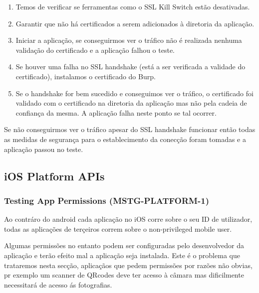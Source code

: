 \begin{enumerate}
\item Temos de verificar se ferramentas como o SSL Kill Switch estão desativadas.\par
\hfill\par
\item Garantir que não há certificados a serem adicionados à diretoria da aplicação.\par
\hfill\par
\item Iniciar a aplicação, se conseguirmos ver o tráfico não é realizada nenhuma validação do certificado e a aplicação falhou o teste.\par
\hfill\par
\item Se houver uma falha no SSL handshake (está a ser verificada a validade do certificado), instalamos o certificado do  Burp.\par
\hfill\par
\item Se o handshake for bem sucedido e conseguimos ver o tráfico, o certificado foi validado com o certificado na diretoria da aplicação mas não pela cadeia de confiança da mesma. A aplicação falha neste ponto se tal ocorrer.
\end{enumerate}


Se não conseguirmos ver o tráfico apesar do SSL handshake funcionar então todas as medidas de segurança para o establecimento da conecção foram tomadas e a aplicação passou no teste.


\subsection{iOS Platform APIs}
\hfill\par


\subsubsection{Testing App Permissions (MSTG-PLATFORM-1)}
\hfill\par
\hfill\par

Ao contráro do android  cada aplicação no iOS corre sobre o seu ID de utilizador, todas as aplicações de terçeiros correm sobre o non-privileged mobile user.

Algumas permissões no entanto podem ser configuradas pelo desenvolvedor da aplicação e terão efeito mal a aplicação seja instalada. Este é o problema que trataremos nesta secção, aplicaçãos que pedem permissões por razões não obvias, pr exemplo um scanner de QRcodes deve ter acesso à câmara mas dificilmente necessitará de acesso ás fotografias.\par
\hfill\par

